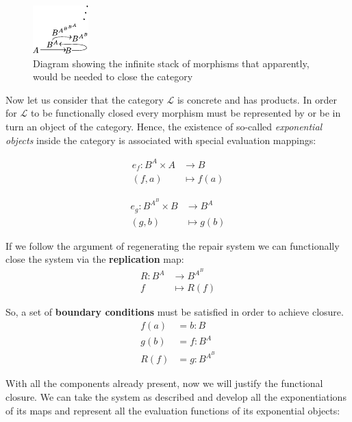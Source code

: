 \documentclass[aps,twocolumn]{revtex4-1}
\begin{document}
\begin{figure}
\noindent\includegraphics[width=0.45\columnwidth]{fig/mrcatinf.pdf}
\caption{Diagram showing the infinite stack of morphisms that apparently, would be needed to close the category}
\label{fig:hom}
\end{figure}

Now let us consider that the category $\mathcal{L}$ is concrete and has products. In order for  $\mathcal{L}$  to be functionally closed every morphism must be represented by or be in turn an object of the category. Hence, the existence of so-called {\it exponential objects} inside the category is associated with special evaluation mappings:

\begin{align*}
e_f : B^A \times A &\longrightarrow B\\
(f,a) & \longmapsto f(a)
\end{align*}
		
\begin{align*}
			e_g: B^{A^B} \times B &\longrightarrow B^A\\
	    			            (g,b) & \longmapsto    g(b)
			\end{align*}		

If we follow the argument of regenerating the repair system we can functionally close the system via the \textbf{replication} map:
\begin{align*}
R: B^A & \longrightarrow B^{A^B}\\
f & \longmapsto R(f)
\end{align*}	

So, a set of \textbf{boundary conditions} must be satisfied in order to achieve closure.
			\begin{align*}
			f(a) &= b : B\\
			g(b) &= f : B^A\\
			R(f) &= g : B^{A^B}
			\end{align*}

With all the components already present, now we will justify the functional closure. We can take the system as described and develop all the exponentiations of its maps and represent all the evaluation functions of its exponential objects:		
\end{document}
